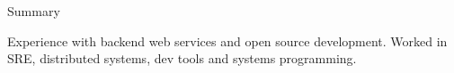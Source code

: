 \documentclass{resume} %
\begin{document}

\begin{rSection}{Summary}
  \begin{rSummarySection}
  {
    \item Experience with backend web services and open source development. Worked in SRE, distributed systems, dev tools and systems programming.
  }
  \end{rSummarySection}
\end{rSection}

\end{document}
